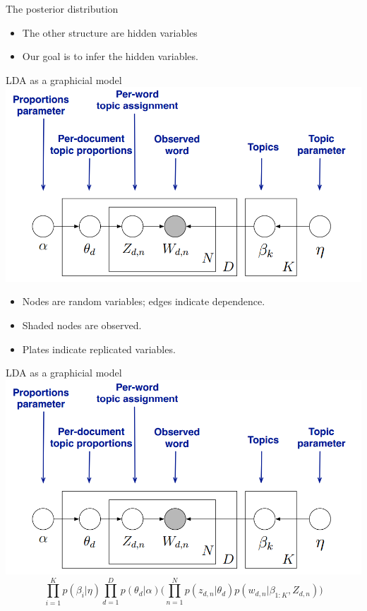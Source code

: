 \documentclass[hyperref={unicode}]{beamer}
\begin{document}
\begin{CJK}{UTF8}{gkai}
\begin{frame}{The posterior distribution}
\begin{itemize}
  \item The other structure are \alert{hidden variables}
  \item Our goal is to \alert{infer} the hidden variables.
  \end{itemize}
\end{frame}
\begin{frame}{LDA as a graphicial model}
  \includegraphics[scale=0.4]{graph}
  \begin{itemize}
  \item Nodes are random variables; \alert{edges} indicate \alert{dependence}.
  \item \alert{Shaded} nodes are observed.
  \item Plates indicate replicated variables.
  \end{itemize}
\end{frame}
\begin{frame}{LDA as a graphicial model}
  \includegraphics[scale=0.4]{graph}
    \[
    \prod_{i=1}^Kp(\beta_i|\eta)\prod_{d=1}^Dp(\theta_d|\alpha)\Big(\prod_{n=1}^Np(z_{d,n}|\theta_d)p(w_{d,n}|\beta_{1:K},Z_{d,n})\Big)
    \]
\end{frame}


\end{CJK}
\end{document}

